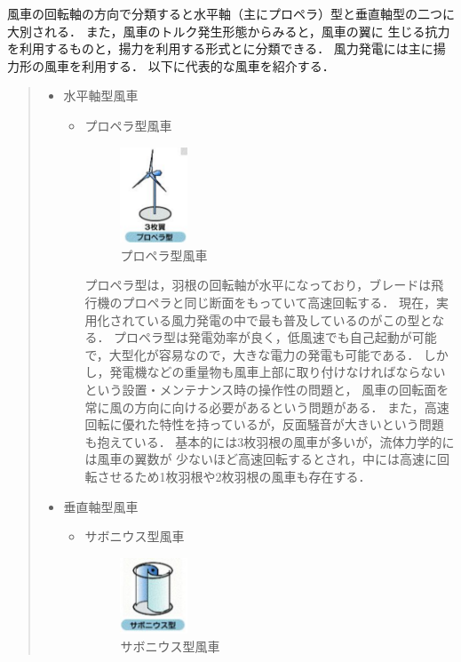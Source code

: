 \documentclass[a4paper,12pt,showkeys]{jreport}
\begin{document}
風車の回転軸の方向で分類すると水平軸（主にプロペラ）型と垂直軸型の二つに大別される．
また，風車のトルク発生形態からみると，風車の翼に
生じる抗力を利用するものと，揚力を利用する形式とに分類できる．
風力発電には主に揚力形の風車を利用する．
以下に代表的な風車を紹介する\cite{牛山}．
\begin{quotation}
\begin{itemize}
\item 水平軸型風車

\begin{itemize}
\item プロペラ型風車

\begin{figure}[h]
\centering
\includegraphics[width=2cm, clip]{fuusya1.eps}
\caption{プロペラ型風車}
\label{fig:fuusya2}
\end{figure}

プロペラ型は，羽根の回転軸が水平になっており，ブレードは飛行機のプロペラと同じ断面をもっていて高速回転する．
現在，実用化されている風力発電の中で最も普及しているのがこの型となる．
プロペラ型は発電効率が良く，低風速でも自己起動が可能で，大型化が容易なので，大きな電力の発電も可能である．
しかし，発電機などの重量物も風車上部に取り付けなければならないという設置・メンテナンス時の操作性の問題と，
風車の回転面を常に風の方向に向ける必要があるという問題がある．
また，高速回転に優れた特性を持っているが，反面騒音が大きいという問題も抱えている．
基本的には3枚羽根の風車が多いが，流体力学的には風車の翼数が
少ないほど高速回転するとされ，中には高速に回転させるため1枚羽根や2枚羽根の風車も存在する\cite{設備}．
\end{itemize}
\end{itemize}


\begin{itemize}
\item 垂直軸型風車

\begin{itemize}
\item サボニウス型風車

\begin{figure}[h]
\centering
\includegraphics[width=2cm, clip]{fuusya2.eps}
\caption{サボニウス型風車}
\label{fig:fuusya2}
\end{figure}


\end{itemize}
\end{itemize}
\end{quotation}
\end{document}
